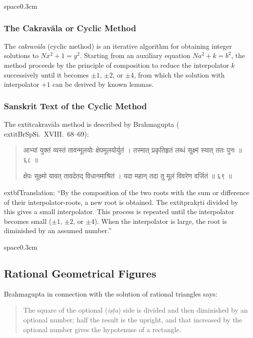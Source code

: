 \documentclass[11pt,a4paper]{article}
\newcommand{\dev}[1]{{\devanagarifont #1}}
\newenvironment{sanskritverse}{%
  \begin{quote}
  \devanagarifont
  \small
  \color{titlecolor}
}{\end{quote}}
\theoremstyle{definition}
\begin{document}
space{0.3cm}

\subsubsection{The Cakrav\=ala or Cyclic Method}

The \textit{cakrav\=ala} (cyclic method) is an iterative algorithm for obtaining integer solutions to $Nx^2 + 1 = y^2$. Starting from an auxiliary equation $Na^2 + k = b^2$, the method proceeds by the principle of composition to reduce the interpolator $k$ successively until it becomes $\pm 1$, $\pm 2$, or $\pm 4$, from which the solution with interpolator $+1$ can be derived by known lemmas.

\subsubsection{Sanskrit Text of the Cyclic Method}

The 	extit{cakrav\=ala} method is described by Brahmagupta (	extit{BrSpSi}.\ XVIII.\ 68--69):

\begin{sanskritverse}
\dev{आभ्यां युक्तं व्यस्तं तावन्मूलयोः क्षेपमूलयोर्युतं ।}
\dev{तस्मात् प्रकृतिहृतं लब्धं सूक्ष्मं स्यात् ततः पुनः ॥ ६८ ॥}

\dev{क्षेपः सूक्ष्मो यावत् तावदेतद् विधानमाश्रितं ।}
\dev{यदा महान् तदा तु मूलं विवरेण वर्जितं ॥ ६९ ॥}
\end{sanskritverse}

	extbf{Translation:} ``By the composition of the two roots with the sum or difference of their interpolator-roots, a new root is obtained. The 	extit{prak\d{r}ti} divided by this gives a small interpolator. This process is repeated until the interpolator becomes small ($\pm 1$, $\pm 2$, or $\pm 4$). When the interpolator is large, the root is diminished by an assumed number.''

space{0.3cm}

\subsection{Rational Geometrical Figures}

Brahmagupta in connection with the solution of rational triangles says:
\begin{quote}
The square of the optional (\textit{i\d{s}\d{t}a}) side is divided and then diminished by an optional number; half the result is the upright, and that increased by the optional number gives the hypotenuse of a rectangle.
\end{quote}
\end{document}
